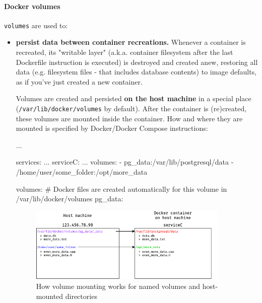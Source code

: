 \documentclass{article}
\newcommand{\dockerinline}[1]{\lstinline[language=docker, style=cstyle, basicstyle=\ttfamily\normalsize]{#1}}
\begin{document}
\paragraph{Docker volumes}

\dockerinline{volumes} are used to:

\begin{itemize}
    \item{\textbf{persist data between container recreations.} Whenever a container is recreated, its "writable layer" (a.k.a. container filesystem after the last Dockerfile instruction is executed) is destroyed and created anew, restoring all data (e.g. filesystem files - that includes database contents) to image defaults, as if you've just created a new container.

        Volumes are created and persisted \textbf{on the host machine} in a special place (\texttt{/var/lib/docker/volumes} by default). After the container is (re)created, these volumes are mounted inside the container. How and where they are mounted is specified by Docker/Docker Compose instructions:

        \begin{dockercode}
            ...

            services:
                ...
                serviceC:
                    ...
                    volumes:
                        - pg_data:/var/lib/postgresql/data
                        - /home/user/some_folder:/opt/more_data

            volumes:
                # Docker files are created automatically for this volume in /var/lib/docker/volumes
                pg_data:
        \end{dockercode}

        \begin{figure}[H]
            \centering
            \includegraphics[width=0.9\textwidth]{img/docker_volumes.png}
            \caption{How volume mounting works for named volumes and host-mounted directories}
            \label{preparations:dockervolumes_pic}
        \end{figure}

}
\end{itemize}
\end{document}
